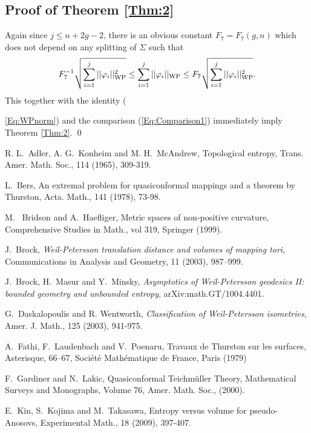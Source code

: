 \documentclass[11pt,reqno]{amsart}
\numberwithin{equation}{section}
\begin{document}
\subsection{Proof of Theorem \ref{Thm:2}} 
Again since  $j \leq n+2g-2$,  
there is an obvious constant  $F_7 = F_7(g,n)$  which does not 
depend on any splitting of  $\varSigma$  such that  
\begin{equation}
	F_7^{-1} \sqrt{\sum_{i=1}^j || \varphi_i ||_{{\rm WP}}^2}   
	\leq\sum_{i=1}^j ||\varphi_i ||_{{\rm WP}} 
	\leq F_7 \sqrt{\sum_{i=1}^j || \varphi_i ||_{{\rm WP}}^2}.   
\end{equation} 
This together with the identity  ({\ref{Eq:WPnorm})
and the comparison (\ref{Eq:Comparison1})  
immediately imply Theorem \ref{Thm:2}. 
\qed

\begin{thebibliography}{99}

R. L.~Adler, A. G.~Konheim and M. H.~McAndrew, 
Topological entropy, 
Trans. Amer. Math. Soc., 114 (1965), 309-319.  

L.~Bers, 
An extremal problem for quasiconformal mappings and 
a theorem by Thurston, 
Acta. Math., 141 (1978), 73-98.  

M.~ Bridson and A.~Haefliger, 
Metric spaces of non-positive curvature, 
Comprehensive Studies in Math., vol 319, Springer (1999).  

J.~Brock, 
{\it Weil-Petersson translation distance and volumes of mapping tori}, 
Communications in Analysis and Geometry, 11 (2003),  
987--999. 

J.~Brock, H.~Masur and Y.~Minsky, 
{\it Asymptotics of Weil-Petersson geodesics II: 
bounded geometry and unbounded entropy},  
arXiv:math.GT/1004.4401.  

G.~Daskalopoulis and R. Wentworth, 
{\it Classification of Weil-Petersson isometries}, 
Amer. J. Math., 125 (2003), 941-975.  

A.~Fathi, F.~Laudenbach and V.~Poenaru, 
Travaux de Thurston sur les surfaces,
Asterisque, 66--67, 
Soci\'et\'e Math\'ematique de France, Paris (1979) 

F.~Gardiner and N.~Lakic, 
Quasiconformal Teichm\"uller Theory, 
Mathematical Surveys and Monographs, Volume 76, 
Amer. Math. Soc., (2000).  

E.~Kin, S.~Kojima and M.~Takasawa, 
Entropy versus volume for pseudo-Anosovs, 
Experimental Math., 18 (2009), 397-407.  


\end{thebibliography}}
\end{document}
